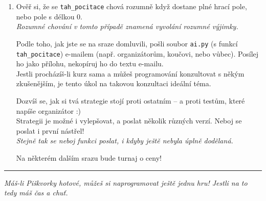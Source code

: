 \documentclass[a4paper,10pt]{article}
\newcommand\startsection[1]{
     \vspace{0.2ex}
    \hrule
    {\fontspec{Oxygen} \tiny
     \vspace{-1ex}
     \emph{#1}
     \vspace{-1.5em}
    }
}
\begin{document}
\begin{enumerate}
\item Ověř si, že se \texttt{tah\_pocitace} chová rozumně když dostane plné hrací pole, nebo pole s délkou 0.
    \\\emph{\small Rozumné chování v tomto případě znamená vyvolání rozumné výjimky.}

    Podle toho, jak jste se na sraze domluvili, pošli
    soubor \texttt{ai.py} (s funkcí \texttt{tah\_pocitace})
    e-mailem (např. organizátorům, koučovi, nebo vůbec).
    Posílej ho jako přílohu, nekopíruj ho do textu e-mailu.
    \\Jestli procházíš-li kurz sama a můžeš programování konzultovat s někým
    zkušenějším, je tento úkol na takovou konzultaci ideální téma.

    Dozvíš se, jak si tvá strategie stojí proti ostatním – a proti testům, které napíše organizátor :)
    \\Strategii je možné i vylepšovat, a poslat několik různých verzí. Neboj se poslat i první nástřel!
    \\\emph{\small Stejně tak se neboj funkci poslat, i kdyby ještě nebyla úplně dodělaná.}

    Na některém dalším srazu bude turnaj o ceny!

\end{enumerate}

\newpage

\startsection{Máš-li Piškvorky hotové, můžeš si naprogramovat ještě jednu hru! Jestli na to tedy máš čas a chuť.}
\end{document}
